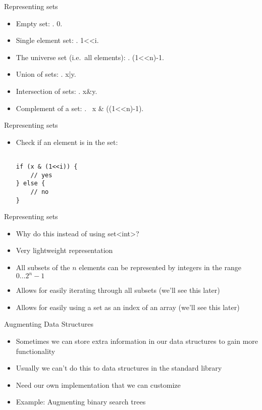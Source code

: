 \documentclass[12pt,t]{beamer}
\newcommand{\bi}{\begin{itemize}}
\newcommand{\ei}{\end{itemize}}
\begin{document}
\begin{frame}[fragile]{Representing sets}
    \vspace{5pt}
    \bi
        \item Empty set:
            .   0.
        \item Single element set:
            .   1<<i.
        \item The universe set (i.e.\ all elements):
            .   (1<<n)-1.
        \item Union of sets:
            .   x|y.
        \item Intersection of sets: .   x&y.
        \item Complement of a set: .   ~x & ((1<<n)-1).
    \ei
\end{frame}


\begin{frame}[fragile]{Representing sets}
    \vspace{25pt}
    \bi
        \item Check if an element is in the set:
            \begin{verbatim}

if (x & (1<<i)) {
    // yes
} else {
    // no
}
            \end{verbatim}
    \ei
\end{frame}

\begin{frame}{Representing sets}
    \vspace{25pt}
    \bi
        \item Why do this instead of using {\color{vhilight}set<int>}?
        \item Very lightweight representation
        \item All subsets of the $n$ elements can be represented by integers in the range $0\ldots 2^{n}-1$
        \item Allows for easily iterating through all subsets (we'll see this later)
        \item Allows for easily using a set as an index of an array (we'll see this later)
    \ei
\end{frame}


\begin{frame}{Augmenting Data Structures}
    \bi
        \item Sometimes we can store extra information in our data structures to gain more functionality
        \item Usually we can't do this to data structures in the standard library
        \item Need our own implementation that we can customize
        \item Example: Augmenting binary search trees
    \ei
\end{frame}
\end{document}
